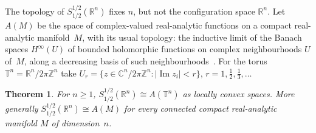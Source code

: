 \documentclass[11pt]{article}
\newtheorem{theorem}{Theorem}[section]
\theoremstyle{definition}
\begin{document}
The topology of $S^{1/2}_{1/2}(\mathbb R^n)$ fixes $n$, but not the configuration space
$\mathbb R^n$. Let $A(M)$ be the space of complex-valued real-analytic functions on a compact
real-analytic manifold~$M$, with its usual topology: the inductive limit of the Banach spaces
$H^\infty(U)$ of bounded holomorphic functions on complex neighbourhoods $U$ of~$M$, along a
decreasing basis of such neighbourhoods~\cite[Sec.~1]{domanski}. For the torus
$\mathbb T^n = \mathbb R^n/2\pi\mathbb Z^n$ take
$U_r = \{z \in \mathbb C^n/2\pi\mathbb Z^n : |\operatorname{Im} z_i| < r\}$, $r = 1, \frac12,
\frac13, \dots$

\begin{theorem}\label{thm:gs-torus}
  For $n \ge 1$, $S^{1/2}_{1/2}(\mathbb R^n) \cong A(\mathbb T^n)$ as locally convex spaces. More
  generally $S^{1/2}_{1/2}(\mathbb R^n) \cong A(M)$ for every connected compact real-analytic
  manifold $M$ of dimension~$n$.
\end{theorem}
\end{document}

